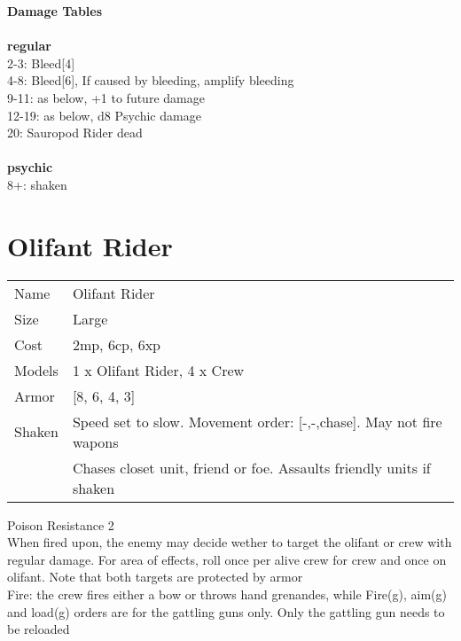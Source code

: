 {\bf Damage Tables} \\
\ \\ {\bf regular } \\
2-3: Bleed[4] \\
4-8: Bleed[6], If caused by bleeding, amplify bleeding \\
9-11: as below, +1 to future damage \\
12-19: as below, d8 Psychic damage \\
20: Sauropod Rider dead \\
\ \\ {\bf psychic } \\
8+: shaken \\










\pagebreak\pagebreak

\section{ Olifant Rider }

\begin{tabular}{ll}
  Name & Olifant Rider \\
  Size & Large\\
  Cost & 2mp, 6cp, 6xp\\
  Models & 1 x Olifant Rider, 4 x Crew\\
  Armor & [8, 6, 4, 3]\\
  Shaken & Speed set to slow. Movement order: [-,-,chase]. May not fire wapons\ \\ &Chases closet unit, friend or foe. Assaults friendly units if shaken\\
\end{tabular}

\noindent Poison Resistance 2\\ 
When fired upon, the enemy may decide wether to target the olifant or crew with regular damage. For area of effects, roll once per alive crew for crew and once on olifant. Note that both targets are protected by armor\\ 
Fire: the crew fires either a bow or throws hand grenandes, while Fire(g), aim(g) and load(g) orders are for the gattling guns only. Only the gattling gun needs to be reloaded\\ 


